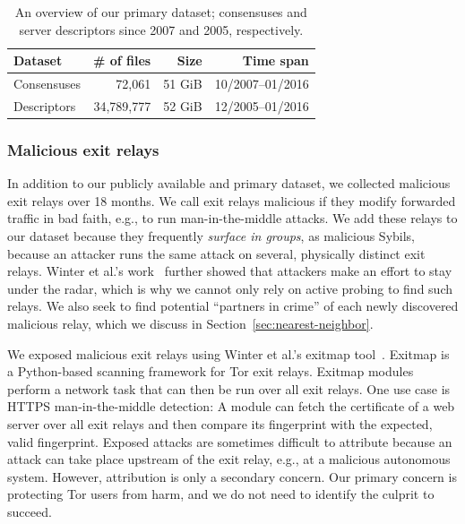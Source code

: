 \begin{table}[t]
\small
\centering
\begin{tabular}{l r r r}
\toprule
\textbf{Dataset} & \textbf{\# of files} & \textbf{Size} & \textbf{Time span} \\
\midrule
Consensuses & 72,061 & 51 GiB & 10/2007--01/2016 \\
Descriptors & 34,789,777 & 52 GiB & 12/2005--01/2016 \\
\bottomrule
\end{tabular}
\caption{An overview of our primary dataset; consensuses and server descriptors
since 2007 and 2005, respectively.}
\label{tab:collector-dataset}
\end{table}

\subsubsection{Malicious exit relays}
In addition to our publicly available and primary dataset, we collected
malicious exit relays over 18 months.  We call exit relays malicious if they
modify forwarded traffic in bad faith, e.g., to run man-in-the-middle attacks.
We add these relays to our dataset because they frequently \emph{surface in
groups}, as malicious Sybils, because an attacker runs the same attack on
several, physically distinct exit relays.  Winter et al.'s
work~\cite[\S~5.2]{Winter2014a} further showed that attackers make an effort to
stay under the radar, which is why we cannot only rely on active probing to
find such relays.  We also seek to find potential ``partners in crime'' of each
newly discovered malicious relay, which we discuss in
Section~\ref{sec:nearest-neighbor}.

We exposed malicious exit relays using Winter et al.'s exitmap
tool~\cite{Winter2014a}.  Exitmap is a Python-based scanning framework for Tor
exit relays.  Exitmap modules perform a network task that can then be run over
all exit relays.  One use case is HTTPS man-in-the-middle detection: A module
can fetch the certificate of a web server over all exit relays and then compare
its fingerprint with the expected, valid fingerprint.  Exposed attacks are
sometimes difficult to attribute because an attack can take place upstream of the
exit relay, e.g., at a malicious autonomous system.  However, attribution is
only a secondary concern.  Our primary concern is protecting Tor users from
harm, and we do not need to identify the culprit to succeed.

